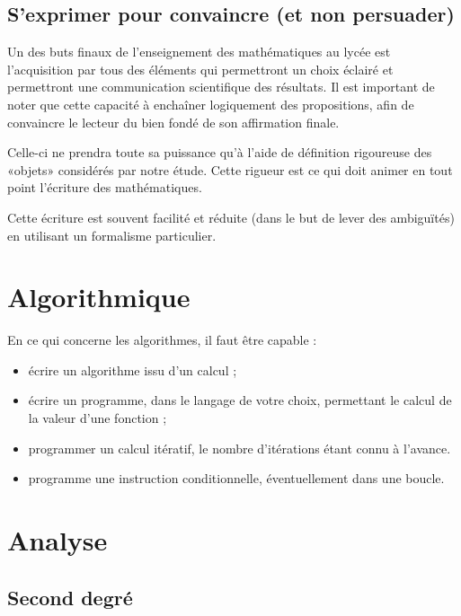 \documentclass[a4paper,12pt,french]{article}
\begin{document}
\subsection{S'exprimer pour convaincre (et non persuader)}

Un des buts finaux de l'enseignement des mathématiques au lycée est
l'acquisition par tous des éléments qui permettront un choix éclairé et
permettront une communication scientifique des résultats. Il est
important de noter que cette capacité à enchaîner logiquement des
propositions, afin de convaincre le lecteur du bien fondé de son
affirmation finale.

Celle-ci ne prendra toute sa puissance qu'à l'aide de définition
rigoureuse des «objets» considérés par notre étude. Cette rigueur est ce
qui doit animer en tout point l'écriture des mathématiques.

Cette écriture est souvent facilité et réduite (dans le but de lever des
ambiguïtés) en utilisant un formalisme particulier.

\section{Algorithmique}

En ce qui concerne les algorithmes, il faut être capable :
\begin{itemize}
  \item écrire un algorithme issu d'un calcul ;
  \item écrire un programme, dans le langage de votre choix, permettant
    le calcul de la valeur d'une fonction ;
  \item programmer un calcul itératif, le nombre d'itérations étant
    connu à l'avance.
  \item programme une instruction conditionnelle, éventuellement dans
    une boucle.
\end{itemize}

\section{Analyse}

\subsection{Second degré}
\end{document}
